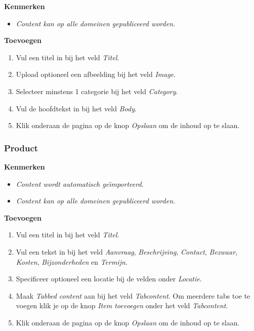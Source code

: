 \textbf{Kenmerken}

\begin{itemize}
\item \emph{Content kan op alle domeinen gepubliceerd worden.}
\end{itemize}

\textbf{Toevoegen}

\begin{enumerate}
\item Vul een titel in bij het veld \emph{Titel}.
\item Upload optioneel een afbeelding bij het veld \emph{Image}.
\item Selecteer minstens 1 categorie bij het veld \emph{Category}.
\item Vul de hoofdtekst in bij het veld \emph{Body}.
\item Klik onderaan de pagina op de knop \emph{Opslaan} om de inhoud op te slaan.
\end{enumerate}

\subsubsection{Product}\label{product}

\textbf{Kenmerken}

\begin{itemize}
\item \emph{Content wordt automatisch ge{\"\i}mporteerd.}
\item \emph{Content kan op alle domeinen gepubliceerd worden.}
\end{itemize}

\textbf{Toevoegen}

\begin{enumerate}
\item Vul een titel in bij het veld \emph{Titel}.
\item Vul een tekst in bij het veld \emph{Aanvraag}, \emph{Beschrijving}, \emph{Contact}, \emph{Bezwaar}, \emph{Kosten}, \emph{Bijzonderheden} en \emph{Termijn}.
\item Specificeer optioneel een locatie bij de velden onder \emph{Locatie}.
\item Maak \emph{Tabbed content} aan bij het veld \emph{Tabcontent}. Om meerdere tabs toe te voegen klik je op de knop \emph{Item toevoegen} onder het veld \emph{Tabcontent}.
\item Klik onderaan de pagina op de knop \emph{Opslaan} om de inhoud op te slaan.
\end{enumerate}

